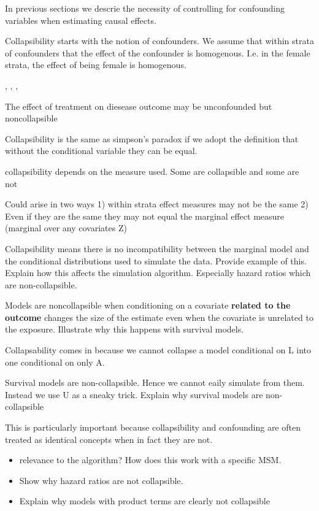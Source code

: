 \documentclass[11pt]{article}
\providecommand{\tightlist}{%
      \setlength{\itemsep}{0pt}\setlength{\parskip}{0pt}}
\begin{document}
In previous sections we descrie the necessity of controlling for
confounding variables when estimating causal effects.

Collapsibility starts with the notion of confounders. We assume that
within strata of confounders that the effect of the confounder is
homogenous. I.e. in the female strata, the effect of being female is
homogenous.

\citet{Greenland1996}, \citet{Greenland1999}, \citet{Greenland2011},
\citet{Sjoelander2016}

The effect of treatment on diesease outcome may be unconfounded but
noncollapsible

Collapsibility is the same as simpson's paradox if we adopt the
definition that without the conditional variable they can be equal.

collapsibility depends on the measure used. Some are collapsible and
some are not

Could arise in two ways 1) within strata effect measures may not be the
same 2) Even if they are the same they may not equal the marginal effect
measure (marginal over any covariates Z)

Collapsibility means there is no incompatibility between the marginal
model and the conditional distributions used to simulate the data.
Provide example of this. Explain how this affects the simulation
algorithm. Especially hazard ratios which are non-collapsible.

Models are noncollapsible when conditioning on a covariate
\textbf{related to the outcome} changes the size of the estimate even
when the covariate is unrelated to the exposure. Illustrate why this
happens with survival models.

Collapsability comes in because we cannot collapse a model conditional
on L into one conditional on only A.

Survival models are non-collapsible. Hence we cannot eaily simulate from
them. Instead we use U as a sneaky trick. Explain why survival models
are non-collapsible

This is particularly important because collapsibility and confounding
are often treated as identical concepts when in fact they are not.
\citet{Greenland1999}

\begin{itemize}
\tightlist
\item
  relevance to the algorithm? How does this work with a specific MSM.
\item
  Show why hazard ratios are not collapsible.
\item
  Explain why models with product terms are clearly not collapsible
\end{itemize}
\end{document}
